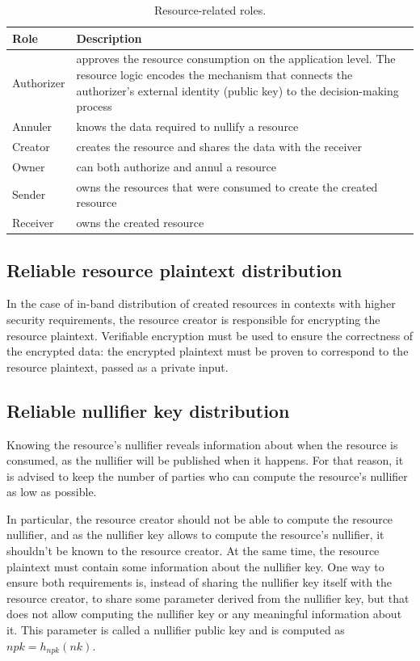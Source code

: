 \documentclass[
    11pt,            %
    techreport,        %
    affiltop,       %
]{art}
\begin{document}
\begin{table}[!h]
\begin{center}
\begin{tabular}{|p{1.5cm}|p{13cm}|}
\hline
 \textbf{Role} & \textbf{Description} \\ \hline
 Authorizer & approves the resource consumption on the application level. The resource logic encodes the mechanism that connects the authorizer's external identity (public key) to the decision-making process \\ \hline
 Annuler & knows the data required to nullify a resource
 \\ \hline
Creator & creates the resource and shares the data with the receiver
\\ \hline
Owner & can both authorize and annul a resource
\\ \hline
Sender & owns the resources that were consumed to create the created resource
\\ \hline
Receiver & owns the created resource
\\ \hline
\end{tabular}
\caption{Resource-related roles.}
\end{center}
\end{table}

\subsection{Reliable resource plaintext distribution}

In the case of in-band distribution of created resources in contexts with higher security requirements, the resource creator is responsible for encrypting the resource plaintext. Verifiable encryption must be used to ensure the correctness of the encrypted data: the encrypted plaintext must be proven to correspond to the resource plaintext, passed as a private input.

\subsection{Reliable nullifier key distribution}

Knowing the resource’s nullifier reveals information about when the resource is consumed, as the nullifier will be published when it happens. For that reason, it is advised to keep the number of parties who can compute the resource’s nullifier as low as possible.

In particular, the resource creator should not be able to compute the resource nullifier, and as the nullifier key allows to compute the resource's nullifier, it shouldn't be known to the resource creator.
At the same time, the resource plaintext must contain some information about the nullifier key. One way to ensure both requirements is, instead of sharing the nullifier key itself with the resource creator, to share some parameter derived from the nullifier key, but that does not allow computing the nullifier key or any meaningful information about it. This parameter is called a nullifier public key and is computed as $npk = h_{npk}(nk)$.
\end{document}
